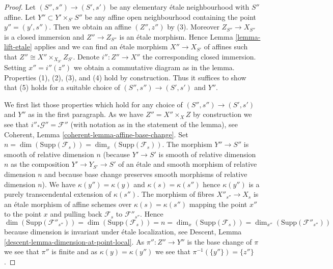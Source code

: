 \begin{proof}
Let $(S'', s'') \to (S', s')$ be any elementary \'etale neighbourhood
with $S''$ affine. Let $Y'' \subset Y' \times_{S'} S''$ be any affine
open neighbourhood containing the point $y'' = (y', s'')$. Then we
obtain an affine $(Z'', z'')$ by (3). Moreover $Z_{S''} \to X_{S''}$
is a closed immersion and $Z'' \to Z_{S''}$ is an \'etale
morphism. Hence
Lemma \ref{lemma-lift-etale}
applies and we can find an \'etale morphism $X'' \to X_{S'}$ of affines
such that $Z'' \cong X'' \times_{X_{S'}} Z_{S'}$. Denote $i'' : Z'' \to X''$
the corresponding closed immersion. Setting $x'' = i''(z'')$ we obtain a
commutative diagram as in the lemma.
Properties (1), (2), (3), and (4) hold by construction.
Thus it suffices to show that (5) holds for a suitable choice of
$(S'', s'') \to (S', s')$ and $Y''$.

\medskip\noindent
We first list those properties which hold for any choice of
$(S'', s'') \to (S', s')$ and $Y''$ as in the first paragraph.
As we have $Z'' = X'' \times_X Z$ by construction we see that
$i''_*\mathcal{G}'' = \mathcal{F}''$ (with notation as in the
statement of the lemma), see
Coherent, Lemma \ref{coherent-lemma-affine-base-change}.
Set $n = \dim(\text{Supp}(\mathcal{F}_s)) = \dim_x(\text{Supp}(\mathcal{F}_s))$.
The morphism $Y'' \to S''$ is smooth of relative dimension $n$
(because $Y' \to S'$ is smooth of relative dimension $n$
as the composition $Y' \to Y_{S'} \to S'$ of an \'etale and
smooth morphism of relative dimension $n$ and because base change
preserves smooth morphisms of relative dimension $n$).
We have $\kappa(y'') = \kappa(y)$ and $\kappa(s) = \kappa(s'')$
hence $\kappa(y'')$ is a purely transcendental extension of $\kappa(s'')$.
The morphism of fibres $X''_{s''} \to X_s$ is an \'etale morphism of affine
schemes over $\kappa(s) = \kappa(s'')$ mapping the point $x''$ to the
point $x$ and pulling back $\mathcal{F}_s$ to $\mathcal{F}''_{s''}$.
Hence
$$
\dim(\text{Supp}(\mathcal{F}''_{s''})) =
\dim(\text{Supp}(\mathcal{F}_s)) = n =
\dim_x(\text{Supp}(\mathcal{F}_s)) =
\dim_{x''}(\text{Supp}(\mathcal{F}''_{s''}))
$$
because dimension is invariant under \'etale localization, see
Descent, Lemma \ref{descent-lemma-dimension-at-point-local}.
As $\pi'' : Z'' \to Y''$ is the base change of $\pi$ we see that
$\pi''$ is finite and as $\kappa(y) = \kappa(y'')$ we see that
$\pi^{-1}(\{y''\}) = \{z''\}$.


\end{proof}

